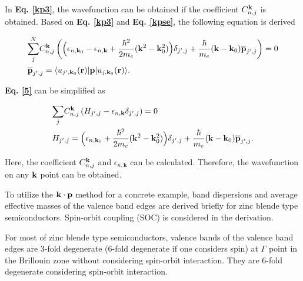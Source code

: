 \documentclass[a4paper, 12pt, titlepage,oneside,drop]{kthesis}
\begin{document}
In \textbf{Eq. \ref{kp3}}, the wavefunction can be obtained if the coefficient $C_{n,j}^{\bold k}$ is obtained. Based on \textbf{Eq. \ref{kp3}} and  \textbf{Eq. \ref{kpse}}, the following equation is derived

\begin{equation}\begin{split}\label{5}
& {\sum\limits_{j}^{N}}  C_{n,j}^{\bold k} \left(  \Big(  \epsilon_{n,\textbf{k}_0} -  \epsilon_{n,\textbf{k}}  + \frac{{\hbar}^2}{2m_e} { (\bold {k}^2- \bold {k}_0^2)}    \Big) \delta_{j',j} + \frac{\hbar}{m_e} {(\bold {k}-\bold{k}_0)} {\overline{\textbf{p}}_{j',j}} \right ) = 0 \\
& {\overline{\textbf{p}}_{j',j}} = \langle \ubloch<j'><\textbf{k}_0>| {\textbf p} | \ubloch<j><\textbf{k}_0>  \rangle.
\end{split}
\end{equation}

\textbf{Eq. \ref{5}} can be simplified as
 
\begin{equation}\begin{split}\label{6}
& {\sum\limits_{j}} C_{n,j}^{\bold {k}} \left ( H_{j',j}-  \epsilon_{n,\textbf{k}} \delta_{j',j} \right ) =0 \\
& H_{j',j} = \Big(   \epsilon_{n,\textbf{k}_0}  + \frac{{\hbar}^2}{2m_e} { (\bold{k}^2-\bold{k}_0^2)}    \Big) \delta_{j',j} + \frac{\hbar}{m_e} {(\bold{k}-\bold{k}_0)} {\overline{\textbf{p}}_{j',j}}.
\end{split}
\end{equation}

Here, the coefficient $ C_{n,j}^{\bold k}$ and $\epsilon_{n,\textbf{k}}$ can be calculated. Therefore, the wavefunction on any ${ \textbf k}$ point can be obtained.

\newpage

To utilize the $\bold k \cdot \bold p$ method for a concrete example, band dispersions and average effective masses of the valence band edges are derived briefly for zinc blende type semiconductors.
Spin-orbit coupling (SOC) is considered in the derivation.

For most of zinc blende type semiconductors, valence bands of the valence band edges are 3-fold degenerate (6-fold degenerate if one considers spin) at $\Gamma$ point in the Brillouin zone without considering spin-orbit interaction.
They are 6-fold degenerate considering spin-orbit interaction.
\end{document}
